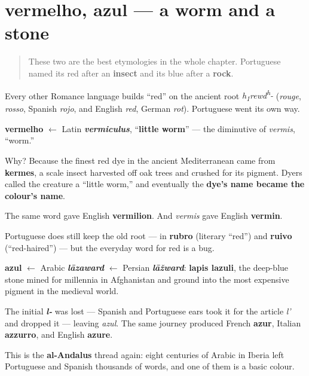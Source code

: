 \section[vermelho, azul]{vermelho, azul — a worm and a stone}

\label{lesson:PT-C13-vermelho-azul}



\begin{quote}
These two are the best etymologies in the whole chapter. Portuguese named its red after an \textbf{insect} and its blue after a \textbf{rock}.
\end{quote}

\begin{cousinweb}
Every other Romance language builds \textquotedblleft{}red\textquotedblright{} on the ancient root \emph{h\textsubscript{1}rewd\textsuperscript{h}-} (\emph{rouge}, \emph{rosso}, Spanish \emph{rojo}, and English \emph{red}, German \emph{rot}). Portuguese went its own way.

\textbf{vermelho} $\leftarrow$ Latin \emph{\textbf{vermiculus}}, \textquotedblleft{}\textbf{little worm}\textquotedblright{} — the diminutive of \emph{vermis}, \textquotedblleft{}worm.\textquotedblright{}

Why? Because the finest red dye in the ancient Mediterranean came from \textbf{kermes}, a scale insect harvested off oak trees and crushed for its pigment. Dyers called the creature a \textquotedblleft{}little worm,\textquotedblright{} and eventually the \textbf{dye's name became the colour's name}.

The same word gave English \textbf{vermilion}. And \emph{vermis} gave English \textbf{vermin}.

Portuguese does still keep the old root — in \textbf{rubro} (literary \textquotedblleft{}red\textquotedblright{}) and \textbf{ruivo} (\textquotedblleft{}red-haired\textquotedblright{}) — but the everyday word for red is a bug.
\end{cousinweb}

\begin{cousinweb}
\textbf{azul} $\leftarrow$ Arabic \emph{\textbf{lāzaward}} $\leftarrow$ Persian \emph{\textbf{lāžward}}: \textbf{lapis lazuli}, the deep-blue stone mined for millennia in Afghanistan and ground into the most expensive pigment in the medieval world.

The initial \emph{\textbf{l-}} was lost — Spanish and Portuguese ears took it for the article \emph{l'} and dropped it — leaving \emph{azul}. The same journey produced French \textbf{azur}, Italian \textbf{azzurro}, and English \textbf{azure}.

This is the \textbf{al-Andalus} thread again: eight centuries of Arabic in Iberia left Portuguese and Spanish thousands of words, and one of them is a basic colour.
\end{cousinweb}

